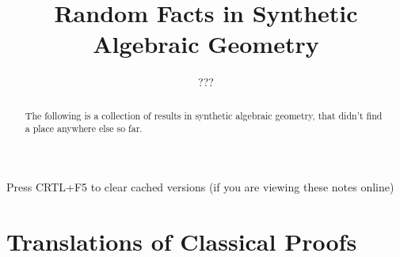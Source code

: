 \documentclass{../util/zariski}
\title{Random Facts in Synthetic Algebraic Geometry}
\author{???}
\begin{document}
\maketitle

\begin{center}
  \color{purple}
  \large{Press CRTL+F5 to clear cached versions}
  \large{(if you are viewing these notes online)}
\end{center}

\begin{abstract}
  The following is a collection of results in synthetic algebraic geometry,
  that didn't find a place anywhere else so far.
\end{abstract}

\tableofcontents

\section{Translations of Classical Proofs}


\printindex

\printbibliography
\end{document}
